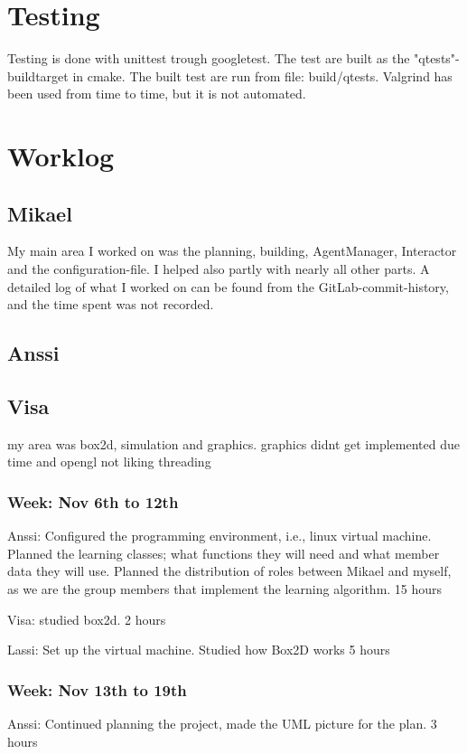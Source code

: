 \documentclass{article}
\begin{document}
\section{Testing}
Testing is done with unittest trough googletest.
The test are built as the "qtests"-buildtarget in cmake.
The built test are run from file: build/qtests.
Valgrind has been used from time to time, but it is not automated.


\section{Worklog}

\subsection{Mikael}
My main area I worked on was the planning, building, AgentManager,
Interactor and the configuration-file. I helped also partly with nearly all
other parts.
A detailed log of what I worked on can be found from the GitLab-commit-history,
and the time spent was not recorded.

\subsection{Anssi}

\subsection{Visa}
my area was box2d, simulation and graphics. graphics didnt get implemented due 
time and opengl not liking threading

\subsubsection{Week: Nov 6th to 12th}
Anssi:
Configured the programming environment, i.e., linux virtual machine.
Planned the learning classes; what functions they will need and what
member data they will use. Planned the distribution of roles between
Mikael and myself, as we are the group members that implement the learning
algorithm.
15 hours

Visa: 
studied box2d.
2 hours

Lassi:
Set up the virtual machine. Studied how Box2D works
5 hours

\subsubsection{Week: Nov 13th to 19th}
Anssi:
Continued planning the project, made the UML picture for the plan.
3 hours
\end{document}
